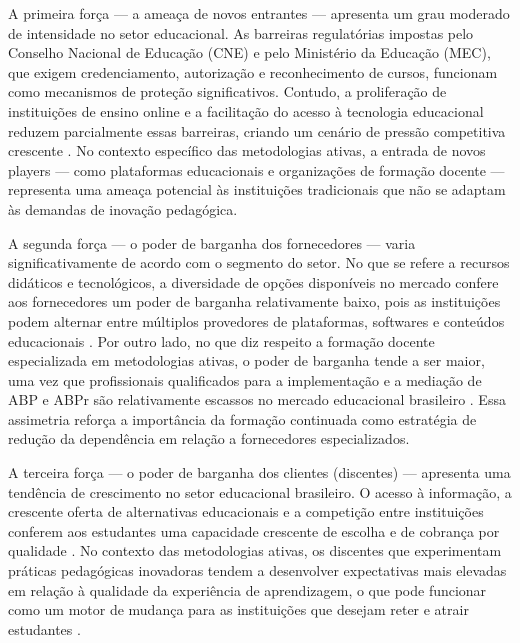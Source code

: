 A primeira força — a ameaça de novos entrantes — apresenta um grau moderado de intensidade no setor educacional. As barreiras regulatórias impostas pelo Conselho Nacional de Educação (CNE) e pelo Ministério da Educação (MEC), que exigem credenciamento, autorização e reconhecimento de cursos, funcionam como mecanismos de proteção significativos. Contudo, a proliferação de instituições de ensino online e a facilitação do acesso à tecnologia educacional reduzem parcialmente essas barreiras, criando um cenário de pressão competitiva crescente \cite{SELWYN2022}. No contexto específico das metodologias ativas, a entrada de novos players — como plataformas educacionais e organizações de formação docente — representa uma ameaça potencial às instituições tradicionais que não se adaptam às demandas de inovação pedagógica.

A segunda força — o poder de barganha dos fornecedores — varia significativamente de acordo com o segmento do setor. No que se refere a recursos didáticos e tecnológicos, a diversidade de opções disponíveis no mercado confere aos fornecedores um poder de barganha relativamente baixo, pois as instituições podem alternar entre múltiplos provedores de plataformas, softwares e conteúdos educacionais \cite{MEZZARI2011}. Por outro lado, no que diz respeito a formação docente especializada em metodologias ativas, o poder de barganha tende a ser maior, uma vez que profissionais qualificados para a implementação e a mediação de ABP e ABPr são relativamente escassos no mercado educacional brasileiro \cite{CANTANHEDE2026}. Essa assimetria reforça a importância da formação continuada como estratégia de redução da dependência em relação a fornecedores especializados.

A terceira força — o poder de barganha dos clientes (discentes) — apresenta uma tendência de crescimento no setor educacional brasileiro. O acesso à informação, a crescente oferta de alternativas educacionais e a competição entre instituições conferem aos estudantes uma capacidade crescente de escolha e de cobrança por qualidade \cite{MENEZES2020}. No contexto das metodologias ativas, os discentes que experimentam práticas pedagógicas inovadoras tendem a desenvolver expectativas mais elevadas em relação à qualidade da experiência de aprendizagem, o que pode funcionar como um motor de mudança para as instituições que desejam reter e atrair estudantes \cite{BACICH2018}.

